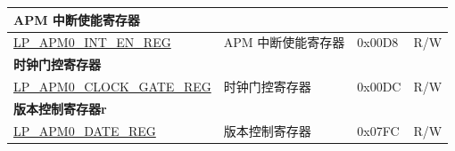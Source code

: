 \begin{longtable}{ | p{6.2cm} | p{6.2cm} | p{2.2cm} | p{1cm} | }
\multicolumn{4}{|l|}{\textbf{APM 中断使能寄存器}} \\ \hline
\hyperref[regdesc:LPAPM0INTENREG]{LP\_APM0\_INT\_EN\_REG} & APM 中断使能寄存器 & 0x00D8 & R/W \\ \hline
\multicolumn{4}{|l|}{\textbf{时钟门控寄存器}} \\ \hline
\hyperref[regdesc:LPAPM0CLOCKGATEREG]{LP\_APM0\_CLOCK\_GATE\_REG} & 时钟门控寄存器 & 0x00DC & R/W \\ \hline
\multicolumn{4}{|l|}{\textbf{版本控制寄存器r}} \\ \hline
\hyperref[regdesc:LPAPM0DATEREG]{LP\_APM0\_DATE\_REG} & 版本控制寄存器 & 0x07FC & R/W \\ \hline
\end{longtable}
